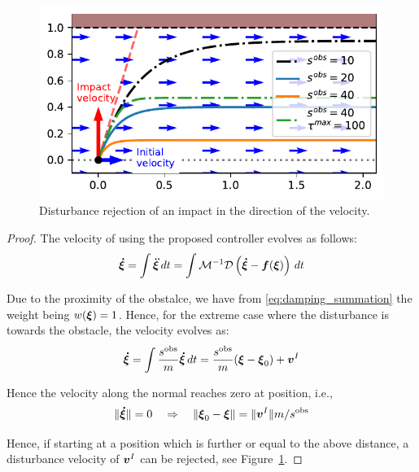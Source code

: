 \begin{figure}[htb]
\centering
  \centerline{\includegraphics[width=0.99\columnwidth]{figures/parallel_avoidance_obstacle}}
  \caption{Disturbance rejection of an impact in the direction of the velocity.}
  \label{fig:disturbance_with_parallel_velocity}
\end{figure}


\begin{proof}
The velocity of using the proposed controller evolves as follows:
\begin{equation}
    \boldsymbol{\dot \xi} = \int \boldsymbol{\ddot \xi} \, dt = \int \mathcal{M}^{-1} \mathcal{D}  
	\left( \boldsymbol{\dot \xi} - \boldsymbol{f}(\boldsymbol{\xi}) \right) \, dt
\end{equation}

Due to the proximity of the obstalce, we have from \eqref{eq:damping_summation} the weight being $w(\boldsymbol{\xi}) = 1$. Hence, for the extreme case where the disturbance is towards the obstacle, the velocity evolves as:
\begin{equation}
    \vecs{\dot \xi} = \int \frac{s^{\mathrm{obs}}}{m} \vecs{\dot \xi} \, dt = \frac{s^{\mathrm{obs}}}{m} (\vecs{\xi} - \vecs \xi_0)  + \vecs v^I \label{eq:velocity_with_control}
\end{equation}

Hence the velocity along the normal reaches zero at position, i.e., 
\begin{equation}
    \| \boldsymbol{\dot \xi} \| = 0
    \quad \Rightarrow \quad
    \|\boldsymbol{\xi}_0 - \boldsymbol{\xi} \| = \| \boldsymbol{v}^I \| {m} / {s^{\mathrm{obs}}} 
\end{equation}

Hence, if starting at a position which is further or equal to the above distance, a disturbance velocity of $\boldsymbol{v}^I$ can be rejected, see Figure~\ref{fig:disturbance_with_parallel_velocity}.
\end{proof}

